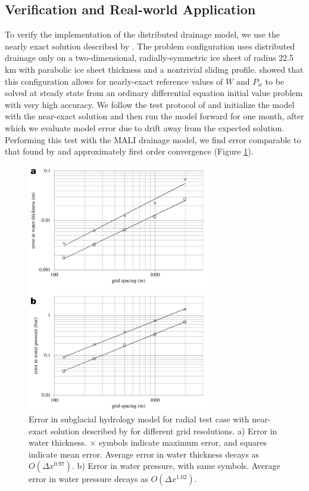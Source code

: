 \subsection{Verification and Real-world Application}

To verify the implementation of the distributed drainage model, we use the nearly exact solution described by \citet{Bueler2015}.
The problem configuration uses distributed drainage only on a two-dimensional, radially-symmetric ice sheet of radius 22.5 km with parabolic ice sheet thickness and a nontrivial sliding profile.  
\citet{Bueler2015} showed that this configuration allows for nearly-exact reference values of $W$ and $P_w$
to be solved at steady state from an ordinary differential equation initial value problem with very high accuracy.
We follow the test protocol of \citet{Bueler2015} and initialize the model
with the near-exact solution and then run the model forward for one month,
after which we evaluate model error due to drift away from the expected solution.
Performing this test with the MALI drainage model, 
we find error comparable to that found by \citet{Bueler2015} and 
approximately first order convergence (Figure \ref{fig:sgh:radialsolnfig}).

\begin{figure}[t]
\centering
\includegraphics[width=8.0cm]{landice/figures/hydro_convergence_plots_clean.pdf}
\caption{
Error in subglacial hydrology model for radial test case with near-exact solution
described by \citet{Bueler2015} for different grid resolutions.
a) Error in water thickness.  $\times$ symbols indicate maximum error, and squares indicate mean error.
Average error in water thickness decays as $O(\Delta x^{0.97})$.
b) Error in water pressure, with same symbols.
Average error in water pressure  decays as $O(\Delta x^{1.02})$.
}
\label{fig:sgh:radialsolnfig}
\end{figure}

